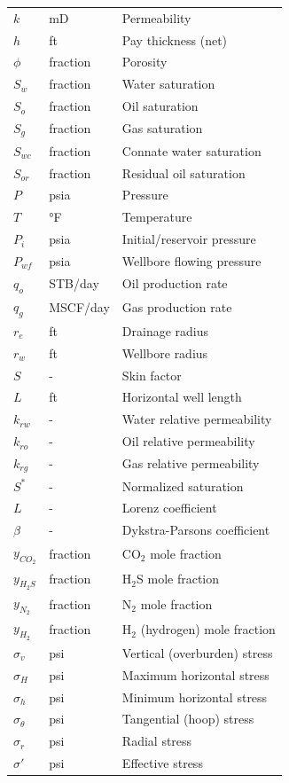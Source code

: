 \documentclass[11pt,a4paper]{article}
\begin{document}
\begin{longtable}{llp{8cm}}
$k$ & mD & Permeability \\
$h$ & ft & Pay thickness (net) \\
$\phi$ & fraction & Porosity \\
$S_w$ & fraction & Water saturation \\
$S_o$ & fraction & Oil saturation \\
$S_g$ & fraction & Gas saturation \\
$S_{wc}$ & fraction & Connate water saturation \\
$S_{or}$ & fraction & Residual oil saturation \\

$P$ & psia & Pressure \\
$T$ & °F & Temperature \\
$P_i$ & psia & Initial/reservoir pressure \\
$P_{wf}$ & psia & Wellbore flowing pressure \\
$q_o$ & STB/day & Oil production rate \\
$q_g$ & MSCF/day & Gas production rate \\
$r_e$ & ft & Drainage radius \\
$r_w$ & ft & Wellbore radius \\
$S$ & - & Skin factor \\
$L$ & ft & Horizontal well length \\

$k_{rw}$ & - & Water relative permeability \\
$k_{ro}$ & - & Oil relative permeability \\
$k_{rg}$ & - & Gas relative permeability \\
$S^*$ & - & Normalized saturation \\

$L$ & - & Lorenz coefficient \\
$\beta$ & - & Dykstra-Parsons coefficient \\

$y_{CO_2}$ & fraction & CO$_2$ mole fraction \\
$y_{H_2S}$ & fraction & H$_2$S mole fraction \\
$y_{N_2}$ & fraction & N$_2$ mole fraction \\
$y_{H_2}$ & fraction & H$_2$ (hydrogen) mole fraction \\

$\sigma_v$ & psi & Vertical (overburden) stress \\
$\sigma_H$ & psi & Maximum horizontal stress \\
$\sigma_h$ & psi & Minimum horizontal stress \\
$\sigma_\theta$ & psi & Tangential (hoop) stress \\
$\sigma_r$ & psi & Radial stress \\
$\sigma'$ & psi & Effective stress \\


\end{longtable}
\end{document}

